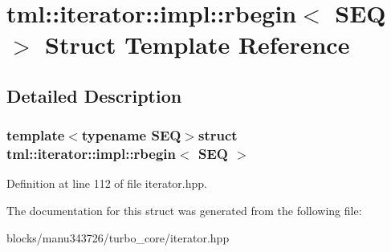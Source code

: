 \hypertarget{structtml_1_1iterator_1_1impl_1_1rbegin}{\section{tml\+:\+:iterator\+:\+:impl\+:\+:rbegin$<$ S\+E\+Q $>$ Struct Template Reference}
\label{structtml_1_1iterator_1_1impl_1_1rbegin}
}


\subsection{Detailed Description}
\subsubsection*{template$<$typename S\+E\+Q$>$struct tml\+::iterator\+::impl\+::rbegin$<$ S\+E\+Q $>$}



Definition at line 112 of file iterator.\+hpp.



The documentation for this struct was generated from the following file\+:\begin{DoxyCompactItemize}
\item 
blocks/manu343726/turbo\+\_\+core/iterator.\+hpp\end{DoxyCompactItemize}

